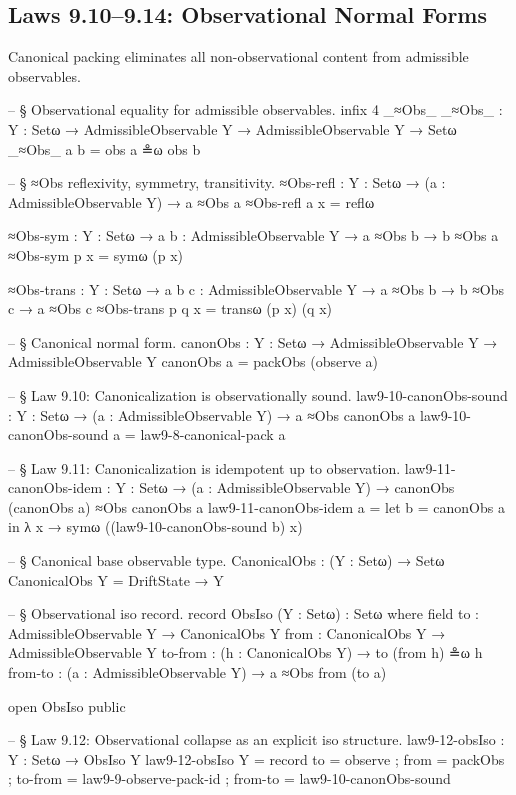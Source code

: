 \documentclass[11pt,a4paper]{book}
\begin{document}
\subsection{Laws 9.10--9.14: Observational Normal Forms}

Canonical packing eliminates all non-observational content from admissible observables.

\begin{code}
-- § Observational equality for admissible observables.
infix 4 _≈Obs_
_≈Obs_ : {Y : Setω} → AdmissibleObservable Y → AdmissibleObservable Y → Setω
_≈Obs_ a b = obs a ≗ω obs b

-- § ≈Obs reflexivity, symmetry, transitivity.
≈Obs-refl : {Y : Setω} → (a : AdmissibleObservable Y) → a ≈Obs a
≈Obs-refl a x = reflω

≈Obs-sym : {Y : Setω} → {a b : AdmissibleObservable Y} → a ≈Obs b → b ≈Obs a
≈Obs-sym p x = symω (p x)

≈Obs-trans : {Y : Setω} → {a b c : AdmissibleObservable Y} → a ≈Obs b → b ≈Obs c → a ≈Obs c
≈Obs-trans p q x = transω (p x) (q x)

-- § Canonical normal form.
canonObs : {Y : Setω} → AdmissibleObservable Y → AdmissibleObservable Y
canonObs a = packObs (observe a)

-- § Law 9.10: Canonicalization is observationally sound.
law9-10-canonObs-sound :
  {Y : Setω} →
  (a : AdmissibleObservable Y) →
  a ≈Obs canonObs a
law9-10-canonObs-sound a = law9-8-canonical-pack a

-- § Law 9.11: Canonicalization is idempotent up to observation.
law9-11-canonObs-idem :
  {Y : Setω} →
  (a : AdmissibleObservable Y) →
  canonObs (canonObs a) ≈Obs canonObs a
law9-11-canonObs-idem a =
  let
    b = canonObs a
  in
  λ x → symω ((law9-10-canonObs-sound b) x)

-- § Canonical base observable type.
CanonicalObs : (Y : Setω) → Setω
CanonicalObs Y = DriftState → Y

-- § Observational iso record.
record ObsIso (Y : Setω) : Setω where
  field
    to      : AdmissibleObservable Y → CanonicalObs Y
    from    : CanonicalObs Y → AdmissibleObservable Y
    to-from : (h : CanonicalObs Y) → to (from h) ≗ω h
    from-to : (a : AdmissibleObservable Y) → a ≈Obs from (to a)

open ObsIso public

-- § Law 9.12: Observational collapse as an explicit iso structure.
law9-12-obsIso : {Y : Setω} → ObsIso Y
law9-12-obsIso {Y} = record
  { to      = observe
  ; from    = packObs
  ; to-from = law9-9-observe-pack-id
  ; from-to = law9-10-canonObs-sound
  }


\end{code}
\end{document}

